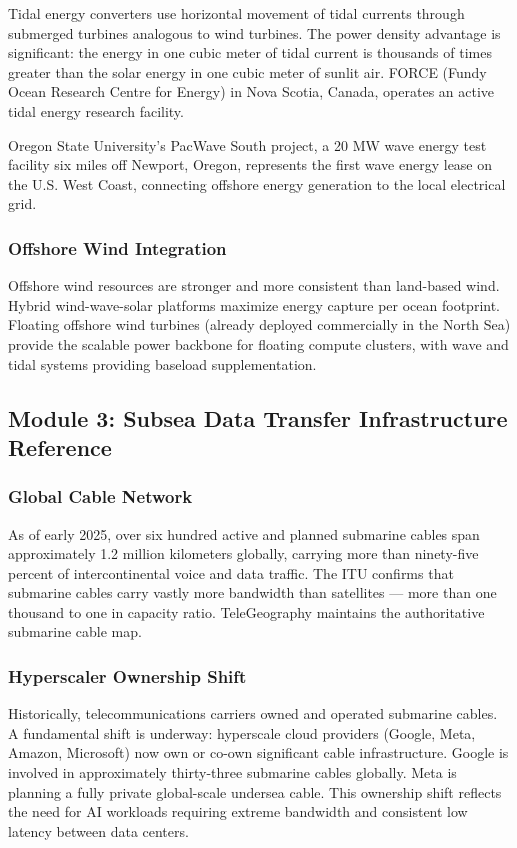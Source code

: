 \documentclass[11pt,letterpaper]{article}
\begin{document}
Tidal energy converters use horizontal movement of tidal currents through submerged turbines analogous to wind turbines. The power density advantage is significant: the energy in one cubic meter of tidal current is thousands of times greater than the solar energy in one cubic meter of sunlit air. FORCE (Fundy Ocean Research Centre for Energy) in Nova Scotia, Canada, operates an active tidal energy research facility.

Oregon State University's PacWave South project, a 20 MW wave energy test facility six miles off Newport, Oregon, represents the first wave energy lease on the U.S. West Coast, connecting offshore energy generation to the local electrical grid.

\subsubsection{Offshore Wind Integration}

Offshore wind resources are stronger and more consistent than land-based wind. Hybrid wind-wave-solar platforms maximize energy capture per ocean footprint. Floating offshore wind turbines (already deployed commercially in the North Sea) provide the scalable power backbone for floating compute clusters, with wave and tidal systems providing baseload supplementation.

\subsection{Module 3: Subsea Data Transfer Infrastructure Reference}

\subsubsection{Global Cable Network}

As of early 2025, over six hundred active and planned submarine cables span approximately 1.2 million kilometers globally, carrying more than ninety-five percent of intercontinental voice and data traffic. The ITU confirms that submarine cables carry vastly more bandwidth than satellites --- more than one thousand to one in capacity ratio. TeleGeography maintains the authoritative submarine cable map.

\subsubsection{Hyperscaler Ownership Shift}

Historically, telecommunications carriers owned and operated submarine cables. A fundamental shift is underway: hyperscale cloud providers (Google, Meta, Amazon, Microsoft) now own or co-own significant cable infrastructure. Google is involved in approximately thirty-three submarine cables globally. Meta is planning a fully private global-scale undersea cable. This ownership shift reflects the need for AI workloads requiring extreme bandwidth and consistent low latency between data centers.
\end{document}
